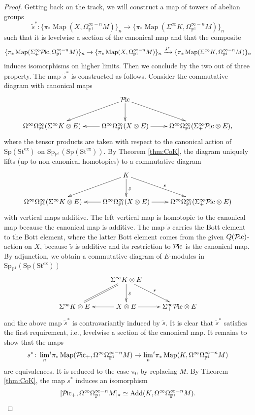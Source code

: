 \documentclass{amsart}
\theoremstyle{plain}
\theoremstyle{definition}
\theoremstyle{remark}
\numberwithin{equation}{theorem}
\newcommand{\Add}{\mathrm{Add}}
\newcommand{\Sp}{\mathrm{Sp}}
\newcommand{\St}{\mathrm{St}}
\newcommand{\ex}{\mathrm{ex}}
\newcommand{\OmegaP}{\Omega_{\mathbb{P}^1}}
\newcommand{\SpP}{\mathrm{Sp}_{\mathbb{P}^1}}
\newcommand{\Pic}{{\mathcal{P}\mspace{-2.0mu}\mathrm{ic}}}
\newcommand{\Map}{\operatorname{Map}}
\begin{document}
\begin{proof}
Getting back on the track, we will construct a map of towers of abelian groups
\[
	\tilde{s}^* \colon \{\pi_*\Map(X,\OmegaP^{\infty-n}M)\}_n \to \{\pi_*\Map(\Sigma^\infty K,\OmegaP^{\infty-n}M)\}_n
\]
such that it is levelwise a section of the canonical map and that the composite
\[
	\{\pi_*\Map(\Sigma^\infty_+\Pic,\OmegaP^{\infty-n}M)\}_n \to
		\{\pi_*\Map(X,\OmegaP^{\infty-n}M)\}_n \xrightarrow{\tilde{s}^*}
			\{\pi_*\Map(\Sigma^\infty K,\OmegaP^{\infty-n}M)\}_n
\]
induces isomorphisms on higher limits.
Then we conclude by the two out of three property.
The map $\tilde{s}^*$ is constructed as follows.
Consider the commutative diagram with canonical maps
\[
\xymatrix{
	& \Pic \ar[ld] \ar[d] \ar[rd] & \\
	\Omega^\infty\OmegaP^\infty(\Sigma^\infty K\otimes E) &
		\Omega^\infty\OmegaP^\infty(X\otimes E) \ar[l] \ar[r] & \Omega^\infty\OmegaP^\infty(\Sigma^\infty_+\Pic\otimes E),
}
\]
where the tensor products are taken with respect to the canonical action of $\Sp(\St^\ex)$ on $\SpP(\Sp(\St^\ex))$.
By Theorem \ref{thm:CoK}, the diagram uniquely lifts (up to non-canonical homotopies) to a commutative diagram
\[
\xymatrix{
	& K \ar[ld] \ar[d]^{\tilde{s}} \ar[rd]^s & \\
	\Omega^\infty\OmegaP^\infty(\Sigma^\infty K\otimes E) &
		\Omega^\infty\OmegaP^\infty(X\otimes E) \ar[l] \ar[r] & \Omega^\infty\OmegaP^\infty(\Sigma^\infty_+\Pic\otimes E)
}
\]
with vertical maps additive.
The left vertical map is homotopic to the canonical map because the canonical map is additive.
The map $\tilde{s}$ carries the Bott element to the Bott element, where the latter Bott element comes from the given $Q(\Pic)$-action on $X$, because $\tilde{s}$ is additive and its restriction to $\Pic$ is the canonical map.
By adjunction, we obtain a commutative diagram of $E$-modules in $\SpP(\Sp(\St^\ex))$
\[
\xymatrix{
	& \Sigma^\infty K\otimes E \ar@{=}[ld] \ar[d]^{\tilde{s}} \ar[rd]^s & \\
	\Sigma^\infty K\otimes E & X\otimes E \ar[l] \ar[r] & \Sigma^\infty_+\Pic\otimes E
}
\]
and the above map $\tilde{s}^*$ is contravariantly induced by $\tilde{s}$.
It is clear that $\tilde{s}^*$ satisfies the first requirement, i.e., levelwise a section of the canonical map.
It remains to show that the maps
\[
	s^* \colon \lim_n\!{}^i\pi_*\Map(\Pic_+,\Omega^\infty\OmegaP^{\infty-n}M) \to \lim_n\!{}^i\pi_*\Map(K,\Omega^\infty\OmegaP^{\infty-n}M)
\]
are equivalences.
It is reduced to the case $\pi_0$ by replacing $M$.
By Theorem \ref{thm:CoK}, the map $s^*$ induces an isomorphism
\[
	[\Pic_+,\Omega^\infty\OmegaP^{\infty-n}M]_* \simeq \Add(K,\Omega^\infty\OmegaP^{\infty-n}M).
\]
\end{proof}
\end{document}
